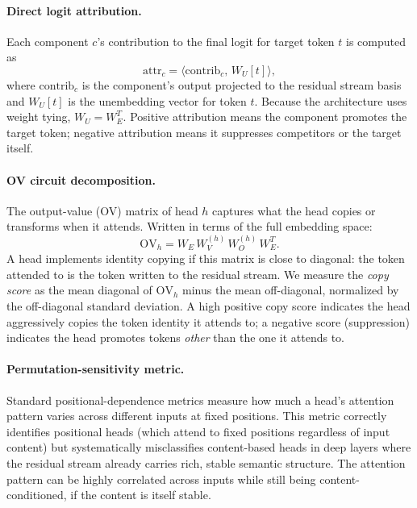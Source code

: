 \paragraph{Direct logit attribution.}
Each component $c$'s contribution to the final logit for target token $t$ is computed as
\begin{equation}
\label{eq:logit_attr}
\text{attr}_c = \langle \text{contrib}_c,\, W_U[t] \rangle,
\end{equation}
where $\text{contrib}_c$ is the component's output projected to the residual stream basis and
$W_U[t]$ is the unembedding vector for token $t$. Because the architecture uses weight tying,
$W_U = W_E^T$. Positive attribution means the component promotes the target token; negative
attribution means it suppresses competitors or the target itself.

\paragraph{OV circuit decomposition.}
The output-value (OV) matrix of head $h$ captures what the head copies or transforms when it
attends. Written in terms of the full embedding space:
\begin{equation}
\label{eq:ov}
\text{OV}_h = W_E\, W_V^{(h)}\, W_O^{(h)}\, W_E^T.
\end{equation}
A head implements identity copying if this matrix is close to diagonal: the token attended to
is the token written to the residual stream. We measure the \emph{copy score} as the mean diagonal
of $\text{OV}_h$ minus the mean off-diagonal, normalized by the off-diagonal standard deviation.
A high positive copy score indicates the head aggressively copies the token identity it attends
to; a negative score (suppression) indicates the head promotes tokens \emph{other} than the one
it attends to.

\paragraph{Permutation-sensitivity metric.}
Standard positional-dependence metrics measure how much a head's attention pattern varies across
different inputs at fixed positions. This metric correctly identifies positional heads (which attend
to fixed positions regardless of input content) but systematically misclassifies content-based heads
in deep layers where the residual stream already carries rich, stable semantic structure. The
attention pattern can be highly correlated across inputs while still being content-conditioned, if
the content is itself stable.

